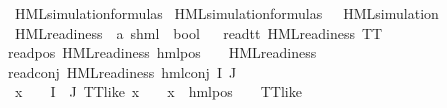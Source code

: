 \begin{isabellebody}
\isanewline
{}\isamarkupfalse%
\ HML{\isacharunderscore}{\kern0pt}simulation{\isacharunderscore}{\kern0pt}formulas\ \isanewline
{\isachardoublequoteopen}HML{\isacharunderscore}{\kern0pt}simulation{\isacharunderscore}{\kern0pt}formulas\ {\isasymequiv}\ {\isacharbraceleft}{\kern0pt}{\isasymphi}{\isachardot}{\kern0pt}\ HML{\isacharunderscore}{\kern0pt}simulation\ {\isasymphi}{\isacharbraceright}{\kern0pt}{\isachardoublequoteclose}\isanewline
\isanewline
{}\isamarkupfalse%
\ HML{\isacharunderscore}{\kern0pt}readiness\ {\isacharcolon}{\kern0pt}{\isacharcolon}{\kern0pt}\ {\isachardoublequoteopen}{\isacharparenleft}{\kern0pt}{\isacharprime}{\kern0pt}a{\isacharcomma}{\kern0pt}\ {\isacharprime}{\kern0pt}s{\isacharparenright}{\kern0pt}hml\ {\isasymRightarrow}\ bool{\isachardoublequoteclose}\isanewline
\ \ \isanewline
read{\isacharunderscore}{\kern0pt}tt{\isacharcolon}{\kern0pt}\ {\isachardoublequoteopen}HML{\isacharunderscore}{\kern0pt}readiness\ TT{\isachardoublequoteclose}\ {\isacharbar}{\kern0pt}\isanewline
read{\isacharunderscore}{\kern0pt}pos{\isacharcolon}{\kern0pt}\ {\isachardoublequoteopen}HML{\isacharunderscore}{\kern0pt}readiness\ {\isacharparenleft}{\kern0pt}hml{\isacharunderscore}{\kern0pt}pos\ {\isasymalpha}\ {\isasymphi}{\isacharparenright}{\kern0pt}{\isachardoublequoteclose}\ \ {\isachardoublequoteopen}HML{\isacharunderscore}{\kern0pt}readiness\ {\isasymphi}{\isachardoublequoteclose}{\isacharbar}{\kern0pt}\isanewline
read{\isacharunderscore}{\kern0pt}conj{\isacharcolon}{\kern0pt}\ {\isachardoublequoteopen}HML{\isacharunderscore}{\kern0pt}readiness\ {\isacharparenleft}{\kern0pt}hml{\isacharunderscore}{\kern0pt}conj\ I\ J\ {\isasymPhi}{\isacharparenright}{\kern0pt}{\isachardoublequoteclose}\ \isanewline
{}\ {\isachardoublequoteopen}{\isacharparenleft}{\kern0pt}{\isasymforall}x\ {\isasymin}\ {\isacharparenleft}{\kern0pt}{\isasymPhi}\ {\isacharbackquote}{\kern0pt}\ {\isacharparenleft}{\kern0pt}I\ {\isasymunion}\ J{\isacharparenright}{\kern0pt}{\isacharparenright}{\kern0pt}{\isachardot}{\kern0pt}\ TT{\isacharunderscore}{\kern0pt}like\ x\ {\isasymor}\ {\isacharparenleft}{\kern0pt}{\isasymexists}{\isasymalpha}\ {\isasymchi}{\isachardot}{\kern0pt}\ x\ {\isacharequal}{\kern0pt}\ hml{\isacharunderscore}{\kern0pt}pos\ {\isasymalpha}\ {\isasymchi}\ {\isasymand}\ TT{\isacharunderscore}{\kern0pt}like\ {\isasymchi}{\isacharparenright}{\kern0pt}{\isacharparenright}{\kern0pt}{\isachardoublequoteclose}\isanewline
\isanewline
{}\isamarkupfalse%

\end{isabellebody}
